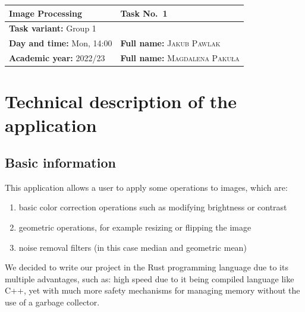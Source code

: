\documentclass[12pt]{article}
\theoremstyle{definition}
\begin{document}
\pagestyle{fancy}
\fancyhead{}
\fancyfoot[C]{\thepage}

\thispagestyle{empty}
\renewcommand{\arraystretch}{2}
\begin{flushleft}
    \begin{tabularx}{0.95\textwidth}{|X|X|}
        \hline
        \bf \large Image Processing                   & \bf \large Task No.~1                           \\ \hline
        \multicolumn{2}{|l|}{
            \textbf{Task variant:} Group 1
        }                                                                                               \\ \hline
        \textbf{Day and time:} Mon, 14:00             & \textbf{Full name:} \textsc{Jakub Pawlak}       \\
        \textbf{Academic year:} {2022/23} & \textbf{Full name:} \textsc{Magdalena Paku\l a} \\
        \hline
    \end{tabularx}
\end{flushleft}
\vspace{1em}
\renewcommand{\arraystretch}{1}

\section{Technical description of the application}
\subsection{Basic information}

This application allows a user to apply some operations to images, which are:
\begin{enumerate}
    \item basic color correction operations such as modifying brightness or contrast
    \item geometric operations, for example resizing or flipping the image
    \item noise removal filters (in this case median and geometric mean)
\end{enumerate}
We decided to write our project in the Rust programming language due to its multiple advantages, such as:
high speed due to it being compiled language like C++, yet with much more safety mechanisms for managing memory without the use of a garbage collector.
\end{document}
